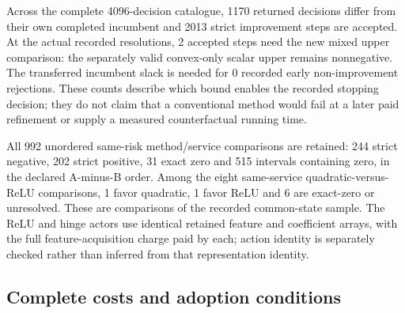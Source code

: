 Across the complete 4096-decision catalogue, 1170 returned decisions differ from their own completed incumbent and 2013 strict improvement steps are accepted. At the actual recorded resolutions, 2 accepted steps need the new mixed upper comparison: the separately valid convex-only scalar upper remains nonnegative. The transferred incumbent slack is needed for 0 recorded early non-improvement rejections. These counts describe which bound enables the recorded stopping decision; they do not claim that a conventional method would fail at a later paid refinement or supply a measured counterfactual running time.

All 992 unordered same-risk method/service comparisons are retained: 244 strict negative, 202 strict positive, 31 exact zero and 515 intervals containing zero, in the declared A-minus-B order. Among the eight same-service quadratic-versus-ReLU comparisons, 1 favor quadratic, 1 favor ReLU and 6 are exact-zero or unresolved. These are comparisons of the recorded common-state sample. The ReLU and hinge actors use identical retained feature and coefficient arrays, with the full feature-acquisition charge paid by each; action identity is separately checked rather than inferred from that representation identity.

\subsection{Complete costs and adoption conditions}\label{sec:costresults120}

